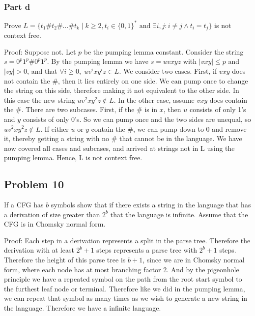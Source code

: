 \documentclass[english]{article}
\begin{document}
\subsubsection*{Part d}
Prove \(L = \{t_1\#t_2\#\ldots\#t_k \mid k \ge 2, t_i \in \{0,1\}^* \textrm{ and } \exists i, j : i \neq j \land t_i = t_j \}\) is not context free.

Proof: Suppose not. Let $p$ be the pumping lemma constant. Consider the string $s = 0^p1^p \# 0^p1^p$. By the pumping lemma we have $s = uvxyz$ with $|vxy| \le p$ and $|vy| > 0$, and that \(\forall i \ge 0,\; uv^ixy^iz \in L\). We consider two cases. First, if $vxy$ does not contain the \#, then it lies entirely on one side. We can pump once to change the string on this side, therefore making it not equivalent to the other side. In this case the new string $uv^2xy^2z \notin L$. In the other case, assume $vxy$ does contain the \#. There are two subcases. First, if the \# is in $x$, then $u$ consists of only 1's and $y$ consists of only 0's. So we can pump once and the two sides are unequal, so $uv^2xy^2z \notin L$. If either $u$ or $y$ contain the \#, we can pump down to 0 and remove it, thereby getting a string with no \# that cannot be in the language. We have now covered all cases and subcases, and arrived at strings not in L using the pumping lemma. Hence, L is not context free.


\subsection*{Problem 10}
If a CFG has $b$ symbols show that if there exists a string in the language that has a derivation of size greater than $2^b$ that
the language is infinite. Assume that the CFG is in Chomsky normal form.

Proof: Each step in a derivation represents a split in the parse tree. Therefore the derivation with at least $2^b + 1$ steps
represents a parse tree with $2^b + 1$ steps. Therefore the height of this parse tree is $b+1$, since we are in Chomsky normal
form, where each node has at most branching factor 2. And by the pigeonhole principle
we have a repeated symbol on the path from the root start symbol to the furthest leaf node or terminal. Therefore like we did
in the pumping lemma, we can repeat that symbol as many times as we wish to generate a new string in the language. Therefore we
have a infinite language.
 
\end{document}
